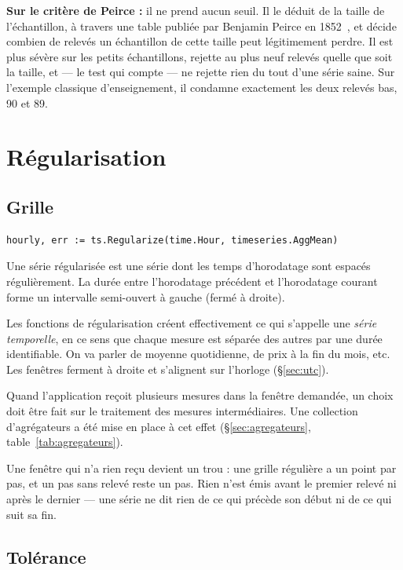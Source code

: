 \documentclass[11pt,a4paper]{report}
\begin{document}
\textbf{Sur le critère de Peirce :} il ne prend aucun seuil. Il le
déduit de la taille de l'échantillon, à travers une table publiée par
Benjamin Peirce en 1852~\cite{peirce1852,ross2003}, et décide combien de relevés un échantillon de
cette taille peut légitimement perdre. Il est plus sévère sur les petits
échantillons, rejette au plus neuf relevés quelle que soit la taille, et
--- le test qui compte --- ne rejette rien du tout d'une série saine.
Sur l'exemple classique d'enseignement, il condamne exactement les deux
relevés bas, 90 et 89.

\chapter{Régularisation}\label{chap:regularisation}

\section{Grille}

\begin{verbatim}
hourly, err := ts.Regularize(time.Hour, timeseries.AggMean)
\end{verbatim}

Une série régularisée est une série dont les temps d'horodatage sont espacés régulièrement. La durée entre l'horodatage précédent et l'horodatage courant forme un 
intervalle semi-ouvert à gauche (fermé à droite).

Les fonctions de régularisation créent effectivement ce qui s'appelle une \textit{série temporelle}, en ce sens que chaque mesure est séparée des autres par une durée identifiable.
On va parler de moyenne quotidienne, de prix à la fin du mois, etc.
Les fenêtres ferment à droite et s'alignent sur l'horloge (\S\ref{sec:utc}).

Quand l'application reçoit plusieurs mesures dans la fenêtre demandée, un choix doit être fait sur le traitement des mesures intermédiaires. Une collection d'agrégateurs a été mise en place à cet effet (§\ref{sec:agregateurs}, table~\ref{tab:agregateurs}).

Une fenêtre qui n'a rien reçu devient un trou : une grille régulière a un
point par pas, et un pas sans relevé reste un pas. Rien n'est émis avant
le premier relevé ni après le dernier --- une série ne dit rien de ce
qui précède son début ni de ce qui suit sa fin.

\section{Tolérance}
\end{document}
